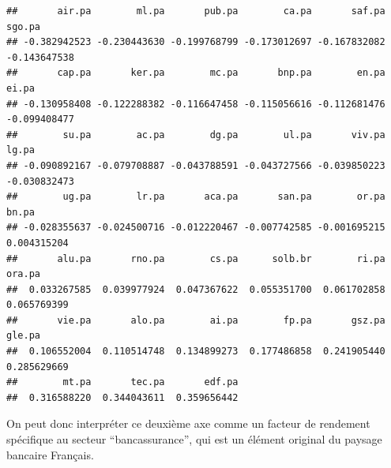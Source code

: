 \documentclass[
]{article}
\begin{document}
\begin{verbatim}
##       air.pa        ml.pa       pub.pa        ca.pa       saf.pa       sgo.pa 
## -0.382942523 -0.230443630 -0.199768799 -0.173012697 -0.167832082 -0.143647538 
##       cap.pa       ker.pa        mc.pa       bnp.pa        en.pa        ei.pa 
## -0.130958408 -0.122288382 -0.116647458 -0.115056616 -0.112681476 -0.099408477 
##        su.pa        ac.pa        dg.pa        ul.pa       viv.pa        lg.pa 
## -0.090892167 -0.079708887 -0.043788591 -0.043727566 -0.039850223 -0.030832473 
##        ug.pa        lr.pa       aca.pa       san.pa        or.pa        bn.pa 
## -0.028355637 -0.024500716 -0.012220467 -0.007742585 -0.001695215  0.004315204 
##       alu.pa       rno.pa        cs.pa      solb.br        ri.pa       ora.pa 
##  0.033267585  0.039977924  0.047367622  0.055351700  0.061702858  0.065769399 
##       vie.pa       alo.pa        ai.pa        fp.pa       gsz.pa       gle.pa 
##  0.106552004  0.110514748  0.134899273  0.177486858  0.241905440  0.285629669 
##        mt.pa       tec.pa       edf.pa 
##  0.316588220  0.344043611  0.359656442
\end{verbatim}

On peut donc interpréter ce deuxième axe comme un facteur de rendement
spécifique au secteur ``bancassurance'', qui est un élément original du
paysage bancaire Français.
\end{document}
